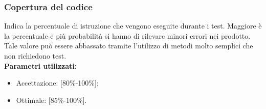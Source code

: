 \subsubsection{Copertura del codice}
Indica la percentuale di istruzione che vengono eseguite durante i test. Maggiore è la percentuale e più probabilità si hanno di rilevare minori errori nei prodotto. Tale valore può essere abbassato tramite l'utilizzo di metodi molto semplici che non richiedono test.\\
\textbf{Parametri utilizzati:}
\begin{itemize}
\item Accettazione: [80\%-100\%];
\item Ottimale: [85\%-100\%].
\end{itemize}